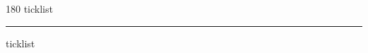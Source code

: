 
\begin{frame}
\begin{center}
\begin{turn}{180}
{\fontsize{2.5cm}{1em}\selectfont ticklist}
\end{turn}
\vspace{1em}\par  
\hrule
\vspace{1em}\par  
{\fontsize{2.5cm}{1em}\selectfont ticklist}
\end{center}
\end{frame}
